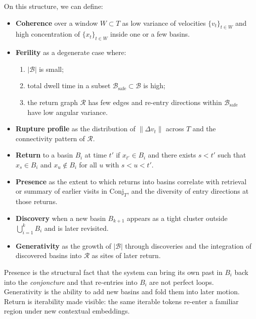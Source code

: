 \documentclass[12pt,a4paper]{article}
\begin{document}
On this structure, we can define:

\begin{itemize}
\item \textbf{Coherence} over a window $W \subset T$ as low variance of velocities $\{v_t\}_{t\in W}$ and high concentration of $\{x_t\}_{t\in W}$ inside one or a few basins.

\item \textbf{Ferility} as a degenerate case where:
\begin{enumerate}
\item $|\mathcal{B}|$ is small;
\item total dwell time in a subset $\mathcal{B}_{\mathrm{safe}} \subset \mathcal{B}$ is high;
\item the return graph $\mathcal{R}$ has few edges and re-entry directions within $\mathcal{B}_{\mathrm{safe}}$ have low angular variance.
\end{enumerate}

\item \textbf{Rupture profile} as the distribution of $\|\Delta v_t\|$ across $T$ and the connectivity pattern of $\mathcal{R}$.

\item \textbf{Return} to a basin $B_i$ at time $t'$ if $x_{t'} \in B_i$ and there exists $s < t'$ such that $x_s \in B_i$ and $x_u \notin B_i$ for all $u$ with $s < u < t'$.

\item \textbf{Presence} as the extent to which returns into basins correlate with retrieval or summary of earlier visits in $\mathrm{Conj}_T$, and the diversity of entry directions at those returns.

\item \textbf{Discovery} when a new basin $B_{k+1}$ appears as a tight cluster outside $\bigcup_{i=1}^k B_i$ and is later revisited.

\item \textbf{Generativity} as the growth of $|\mathcal{B}|$ through discoveries and the integration of discovered basins into $\mathcal{R}$ as sites of later return.
\end{itemize}

Presence is the structural fact that the system can bring its own past in $B_i$ back into the \emph{conjoncture} and that re-entries into $B_i$ are not perfect loops. Generativity is the ability to add new basins and fold them into later motion. Return is iterability made visible: the same iterable tokens re-enter a familiar region under new contextual embeddings.
\end{document}
